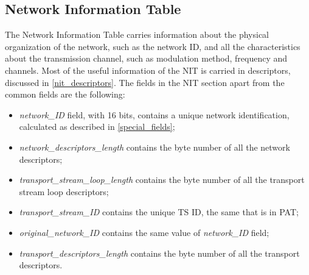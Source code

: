 \documentclass[
	12pt,				%
	openright,			%
	twoside,			%
	a4paper,			%
	brazil,
	french,				%
	english
	]{abntex2}
\begin{document}
\subsection{Network Information Table}
\label{NIT}
The Network Information Table carries information about the physical organization of the network, such as the network ID, and all the characteristics about the transmission channel, such as modulation method, frequency and channels. Most of the useful information of the NIT is carried in descriptors, discussed in \autoref{nit_descriptors}. The fields in the NIT section apart from the common fields are the following:
\begin{itemize}
\item{\textit{network\hspace{0.1mm}\_\hspace{0.1mm}ID} field, with 16 bits, contains a unique network identification, calculated as described in \autoref{special_fields};}
\item{\textit{network\hspace{0.1mm}\_\hspace{0.1mm}descriptors\hspace{0.1mm}\_\hspace{0.1mm}length} contains the byte number of all the network descriptors;}
\item{\textit{transport\hspace{0.1mm}\_\hspace{0.1mm}stream\hspace{0.1mm}\_\hspace{0.1mm}loop\hspace{0.1mm}\_\hspace{0.1mm}length} contains the byte number of all the transport stream loop descriptors;}
\item{\textit{transport\hspace{0.1mm}\_\hspace{0.1mm}stream\hspace{0.1mm}\_\hspace{0.1mm}ID} contains the unique TS ID, the same that is in PAT;}
\item{\textit{original\hspace{0.1mm}\_\hspace{0.1mm}network\hspace{0.1mm}\_\hspace{0.1mm}ID}  contains the same value of \textit{network\hspace{0.1mm}\_\hspace{0.1mm}ID} field;}
\item{\textit{transport\hspace{0.1mm}\_\hspace{0.1mm}descriptors\hspace{0.1mm}\_\hspace{0.1mm}length} contains the byte number of all the transport descriptors.}
\end{itemize}
\end{document}
